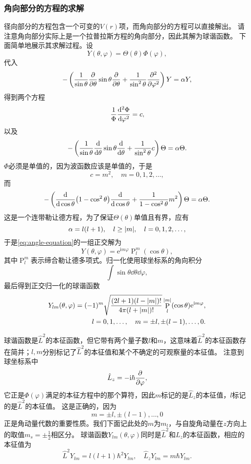 \documentclass[UTF8, a4paper]{ctexart}
\newcommand*{\ee}{\mathrm{e}}
\newcommand*{\ii}{\mathrm{i}}
\DeclareMathOperator{\legpoly}{P}
\begin{document}
\subsubsection{角向部分的方程的求解}

径向部分的方程包含一个可变的$V(r)$项，而角向部分的方程可以直接解出。
请注意角向部分实际上是一个拉普拉斯方程的角向部分，因此其解为球谐函数。
下面简单地展示其求解过程。设
\[
    Y(\theta, \varphi) = \Theta(\theta) \Phi(\varphi),
\]
代入
\[
    - \left( \frac{1}{\sin \theta} \pdv{\theta} \sin \theta \pdv{\theta} + \frac{1}{\sin^2 \theta} \pdv[2]{\varphi} \right) Y = \alpha Y,
\]
得到两个方程
\[
    \frac{1}{\Phi} \dv[2]{\Phi}{\varphi} = c,
\]
以及
\[
    - \left( \frac{1}{\sin \theta} \dv{\theta} \sin \theta \dv{\theta} + \frac{1}{\sin^2 \theta} c \right) \Theta = \alpha \Theta.
\]
$\Phi$必须是单值的，因为波函数应该是单值的，于是
\[
    c = m^2, \quad m = 0, 1, 2, \ldots,
\]
而
\[
    - \left( \dv{\cos \theta} (1 - \cos^2 \theta) \dv{\cos \theta} + \frac{1}{1 - \cos^2 \theta} m^2 \right) \Theta = \alpha \Theta.
\]
这是一个连带勒让德方程，为了保证$\Theta(\theta)$单值且有界，应有
\[
    \alpha = l(l+1), \quad l \geq \abs{m}, \quad l = 0, 1, 2, \ldots,
\]
于是\eqref{eq:angle-equation}的一组正交解为
\[
    Y(\theta, \varphi) = \ee^{\ii m \varphi} \legpoly_l^m(\cos \theta),
\]
其中$\legpoly_l^m$表示缔合勒让德多项式。归一化使用球坐标系的角向积分
\[
    \int \sin \theta \dd{\theta} \dd{\varphi},
\]
最后得到正交归一化的球谐函数
\begin{equation}
    \begin{split}
        Y_{lm}(\theta, \varphi) = (-1)^m \sqrt{\frac{(2l+1)(l-\abs{m})!}{4\pi (l+\abs{m})!}} \legpoly_l^\abs{m} (\cos \theta) \ee^{\ii m \varphi}, \\
        l = 0, 1, \ldots, \quad m = \pm l, \pm (l-1), \ldots, 0 .
    \end{split}
\end{equation}

球谐函数是$\hat{L}^2$的本征函数，但它带有两个量子数$l$和$m$，这意味着$\hat{L}^2$的本征函数存在简并；$l,m$分别标记了$\hat{L}^2$的本征值和某个不确定的可观察量的本征值。
注意到球坐标系中
\[
    \hat{L}_z = - \ii \hbar \pdv{\varphi},
\]
它正是$\Phi(\varphi)$满足的本征方程中的那个算符，因此$m$标记的是$\hat{L}_z$的本征值，$l$标记的是$\hat{L}^2$的本征值。
这是正确的，因为
\[
    m = \pm l, \pm (l-1), \ldots, 0
\]
正是角动量代数的重要性质。我们下面记此处的$m$为$m_l$，与自旋角动量在$z$方向上的取值$m_s = \pm \frac{1}{2}$相区分。
球谐函数$Y_{lm}(\theta, \varphi)$同时是$\hat{L}^2$和$L_z$的本征函数，相应的本征值为
\begin{equation}
    \hat{L}^2 Y_{lm} = l(l+1) \hbar^2 Y_{lm}, \quad \hat{L}_z Y_{lm} = m \hbar Y_{lm}.
    \label{eq:orbital-angular-momentum}
\end{equation}
\end{document}
